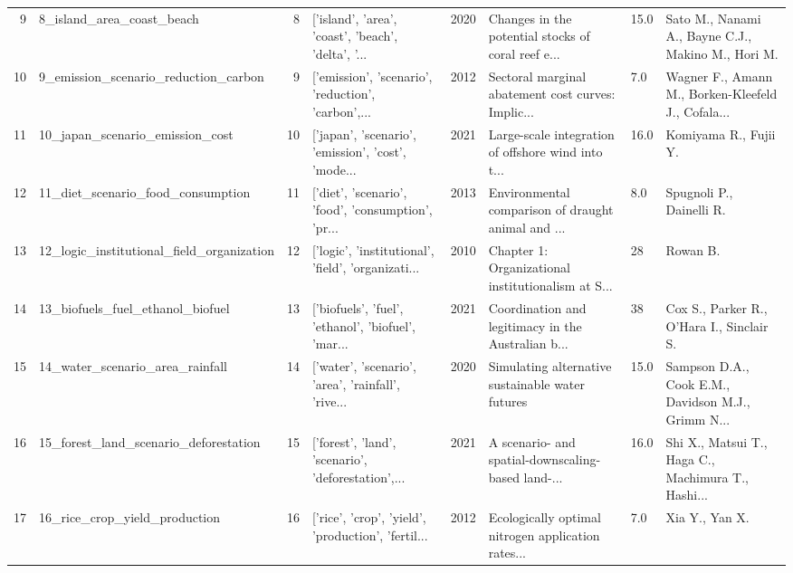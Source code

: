 \begin{tabular}{rlrlrlll}
          9 &                          8\_island\_area\_coast\_beach &         8 & ['island', 'area', 'coast', 'beach', 'delta', '... &          2020 & Changes in the potential stocks of coral reef e... &    15.0 & Sato M., Nanami A., Bayne C.J., Makino M., Hori M. \\
         10 &               9\_emission\_scenario\_reduction\_carbon &         9 & ['emission', 'scenario', 'reduction', 'carbon',... &          2012 & Sectoral marginal abatement cost curves: Implic... &     7.0 & Wagner F., Amann M., Borken-Kleefeld J., Cofala... \\
         11 &                    10\_japan\_scenario\_emission\_cost &        10 & ['japan', 'scenario', 'emission', 'cost', 'mode... &          2021 & Large-scale integration of offshore wind into t... &    16.0 &                              Komiyama R., Fujii Y. \\
         12 &                  11\_diet\_scenario\_food\_consumption &        11 & ['diet', 'scenario', 'food', 'consumption', 'pr... &          2013 & Environmental comparison of draught animal and ... &     8.0 &                           Spugnoli P., Dainelli R. \\
         13 &          12\_logic\_institutional\_field\_organization &        12 & ['logic', 'institutional', 'field', 'organizati... &          2010 & Chapter 1: Organizational institutionalism at S... &      28 &                                           Rowan B. \\
         14 &                   13\_biofuels\_fuel\_ethanol\_biofuel &        13 & ['biofuels', 'fuel', 'ethanol', 'biofuel', 'mar... &          2021 & Coordination and legitimacy in the Australian b... &      38 &          Cox S., Parker R., O'Hara I., Sinclair S. \\
         15 &                    14\_water\_scenario\_area\_rainfall &        14 & ['water', 'scenario', 'area', 'rainfall', 'rive... &          2020 &   Simulating alternative sustainable water futures &    15.0 & Sampson D.A., Cook E.M., Davidson M.J., Grimm N... \\
         16 &              15\_forest\_land\_scenario\_deforestation &        15 & ['forest', 'land', 'scenario', 'deforestation',... &          2021 & A scenario- and spatial-downscaling-based land-... &    16.0 & Shi X., Matsui T., Haga C., Machimura T., Hashi... \\
         17 &                      16\_rice\_crop\_yield\_production &        16 & ['rice', 'crop', 'yield', 'production', 'fertil... &          2012 & Ecologically optimal nitrogen application rates... &     7.0 &                                     Xia Y., Yan X. \\

\end{tabular}
